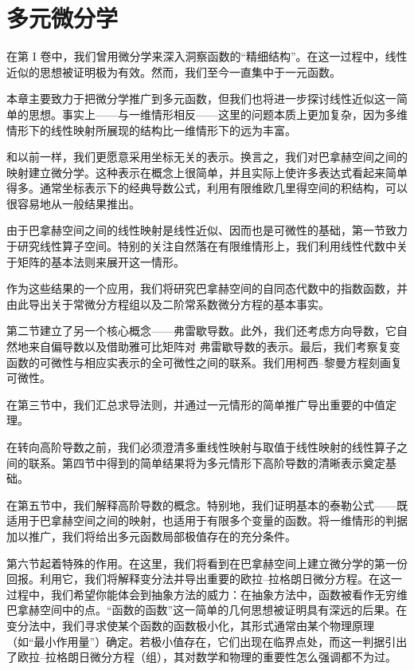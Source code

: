 \chapter{多元微分学}
在第 I 卷中，我们曾用微分学来深入洞察函数的“精细结构”。在这一过程中，线性近似的思想被证明极为有效。然而，我们至今一直集中于一元函数。

本章主要致力于把微分学推广到多元函数，但我们也将进一步探讨线性近似这一简单的思想。事实上——与一维情形相反——这里的问题本质上更加复杂，因为多维情形下的线性映射所展现的结构比一维情形下的远为丰富。

和以前一样，我们更愿意采用坐标无关的表示。换言之，我们对巴拿赫空间之间的映射建立微分学。这种表示在概念上很简单，并且实际上使许多表达式看起来简单得多。通常坐标表示下的经典导数公式，利用有限维欧几里得空间的积结构，可以很容易地从一般结果推出。

由于巴拿赫空间之间的线性映射是线性近似、因而也是可微性的基础，第一节致力于研究线性算子空间。特别的关注自然落在有限维情形上，我们利用线性代数中关于矩阵的基本法则来展开这一情形。

作为这些结果的一个应用，我们将研究巴拿赫空间的自同态代数中的指数函数，并由此导出关于常微分方程组以及二阶常系数微分方程的基本事实。

第二节建立了另一个核心概念——弗雷歇导数。此外，我们还考虑方向导数，它自然地来自偏导数以及借助雅可比矩阵对 弗雷歇导数的表示。最后，我们考察复变函数的可微性与相应实表示的全可微性之间的联系。我们用柯西–黎曼方程刻画复可微性。

在第三节中，我们汇总求导法则，并通过一元情形的简单推广导出重要的中值定理。

在转向高阶导数之前，我们必须澄清多重线性映射与取值于线性映射的线性算子之间的联系。第四节中得到的简单结果将为多元情形下高阶导数的清晰表示奠定基础。

在第五节中，我们解释高阶导数的概念。特别地，我们证明基本的泰勒公式——既适用于巴拿赫空间之间的映射，也适用于有限多个变量的函数。将一维情形的判据加以推广，我们将给出多元函数局部极值存在的充分条件。

第六节起着特殊的作用。在这里，我们将看到在巴拿赫空间上建立微分学的第一份回报。利用它，我们将解释变分法并导出重要的欧拉–拉格朗日微分方程。在这一过程中，我们希望你能体会到抽象方法的威力：在抽象方法中，函数被看作无穷维巴拿赫空间中的点。“函数的函数”这一简单的几何思想被证明具有深远的后果。在变分法中，我们寻求使某个函数的函数极小化，其形式通常由某个物理原理（如“最小作用量”）确定。若极小值存在，它们出现在临界点处，而这一判据引出了欧拉–拉格朗日微分方程（组），其对数学和物理的重要性怎么强调都不为过。

